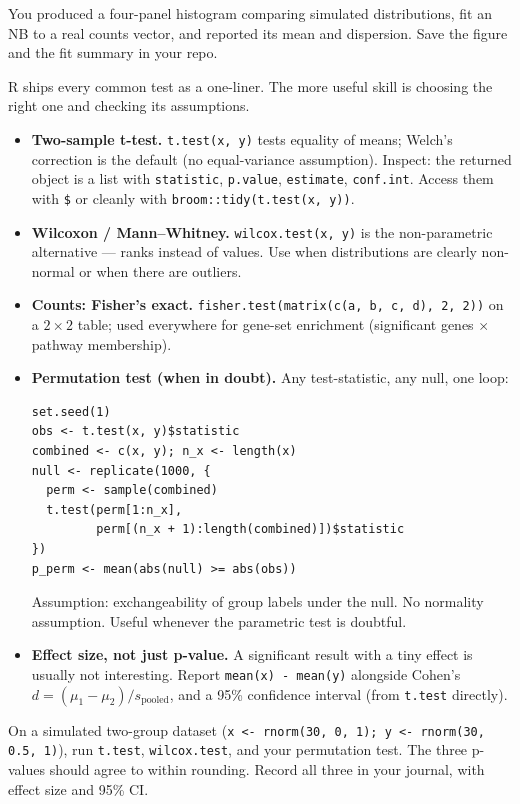 \begin{winbox}[Checkpoint]
You produced a four-panel histogram comparing simulated distributions, fit an NB to a real counts vector, and reported its mean and dispersion. Save the figure and the fit summary in your repo.
\end{winbox}

R ships every common test as a one-liner. The more useful skill is choosing the right one and checking its assumptions.
\begin{itemize}[nosep]
  \item \textbf{Two-sample t-test.} \texttt{t.test(x, y)} tests equality of means; Welch's correction is the default (no equal-variance assumption). Inspect: the returned object is a list with \texttt{statistic}, \texttt{p.value}, \texttt{estimate}, \texttt{conf.int}. Access them with \texttt{\$} or cleanly with \texttt{broom::tidy(t.test(x, y))}.
  \item \textbf{Wilcoxon / Mann--Whitney.} \texttt{wilcox.test(x, y)} is the non-parametric alternative --- ranks instead of values. Use when distributions are clearly non-normal or when there are outliers.
  \item \textbf{Counts: Fisher's exact.} \texttt{fisher.test(matrix(c(a, b, c, d), 2, 2))} on a $2 \times 2$ table; used everywhere for gene-set enrichment (significant genes $\times$ pathway membership).
  \item \textbf{Permutation test (when in doubt).} Any test-statistic, any null, one loop:
    \begin{lstlisting}
set.seed(1)
obs <- t.test(x, y)$statistic
combined <- c(x, y); n_x <- length(x)
null <- replicate(1000, {
  perm <- sample(combined)
  t.test(perm[1:n_x],
         perm[(n_x + 1):length(combined)])$statistic
})
p_perm <- mean(abs(null) >= abs(obs))
    \end{lstlisting}
    Assumption: exchangeability of group labels under the null. No normality assumption. Useful whenever the parametric test is doubtful.
  \item \textbf{Effect size, not just p-value.} A significant result with a tiny effect is usually not interesting. Report \texttt{mean(x) - mean(y)} alongside Cohen's $d = (\mu_1 - \mu_2) / s_\text{pooled}$, and a 95\% confidence interval (from \texttt{t.test} directly).
\end{itemize}
\begin{winbox}[Checkpoint]
On a simulated two-group dataset (\texttt{x <- rnorm(30, 0, 1); y <- rnorm(30, 0.5, 1)}), run \texttt{t.test}, \texttt{wilcox.test}, and your permutation test. The three p-values should agree to within rounding. Record all three in your journal, with effect size and 95\% CI.
\end{winbox}

